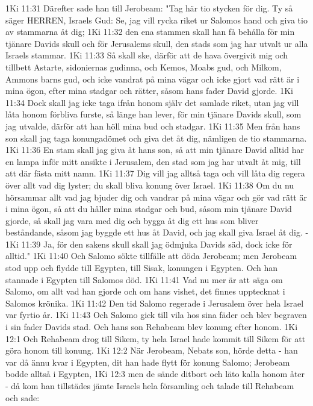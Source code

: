 1Ki 11:31  Därefter sade han till Jerobeam: "Tag här tio stycken för dig. Ty så säger HERREN, Israels Gud: Se, jag vill rycka riket ur Salomos hand och giva tio av stammarna åt dig;
1Ki 11:32  den ena stammen skall han få behålla för min tjänare Davids skull och för Jerusalems skull, den stads som jag har utvalt ur alla Israels stammar.
1Ki 11:33  Så skall ske, därför att de hava övergivit mig och tillbett Astarte, sidoniernas gudinna, och Kemos, Moabs gud, och Milkom, Ammons barns gud, och icke vandrat på mina vägar och icke gjort vad rätt är i mina ögon, efter mina stadgar och rätter, såsom hans fader David gjorde.
1Ki 11:34  Dock skall jag icke taga ifrån honom själv det samlade riket, utan jag vill låta honom förbliva furste, så länge han lever, för min tjänare Davids skull, som jag utvalde, därför att han höll mina bud och stadgar.
1Ki 11:35  Men från hans son skall jag taga konungadömet och giva det åt dig, nämligen de tio stammarna.
1Ki 11:36  En stam skall jag giva åt hans son, så att min tjänare David alltid har en lampa inför mitt ansikte i Jerusalem, den stad som jag har utvalt åt mig, till att där fästa mitt namn.
1Ki 11:37  Dig vill jag alltså taga och vill låta dig regera över allt vad dig lyster; du skall bliva konung över Israel.
1Ki 11:38  Om du nu hörsammar allt vad jag bjuder dig och vandrar på mina vägar och gör vad rätt är i mina ögon, så att du håller mina stadgar och bud, såsom min tjänare David gjorde, så skall jag vara med dig och bygga åt dig ett hus som bliver beståndande, såsom jag byggde ett hus åt David, och jag skall giva Israel åt dig. -
1Ki 11:39  Ja, för den sakens skull skall jag ödmjuka Davids säd, dock icke för alltid."
1Ki 11:40  Och Salomo sökte tillfälle att döda Jerobeam; men Jerobeam stod upp och flydde till Egypten, till Sisak, konungen i Egypten. Och han stannade i Egypten till Salomos död.
1Ki 11:41  Vad nu mer är att säga om Salomo, om allt vad han gjorde och om hans vishet, det finnes upptecknat i Salomos krönika.
1Ki 11:42  Den tid Salomo regerade i Jerusalem över hela Israel var fyrtio år.
1Ki 11:43  Och Salomo gick till vila hos sina fäder och blev begraven i sin fader Davids stad. Och hans son Rehabeam blev konung efter honom.
1Ki 12:1  Och Rehabeam drog till Sikem, ty hela Israel hade kommit till Sikem för att göra honom till konung.
1Ki 12:2  När Jerobeam, Nebats son, hörde detta - han var då ännu kvar i Egypten, dit han hade flytt för konung Salomo; Jerobeam bodde alltså i Egypten,
1Ki 12:3  men de sände ditbort och läto kalla honom åter - då kom han tillstädes jämte Israels hela församling och talade till Rehabeam och sade:
